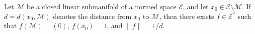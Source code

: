 Let $\mathcal{M}$ be a closed linear submanifold of a normed space $\mathcal{E}$, and let $x_0 \in \mathcal{E} \setminus \mathcal{M}$. If $d = d(x_0, \mathcal{M})$ denotes the distance from $x_0$ to $\mathcal{M}$, then there exists $f \in \mathcal{E}^*$ such that $f(\mathcal{M}) = (0)$, $f(x_0) = 1$, and $\|f\| = 1/d$.
